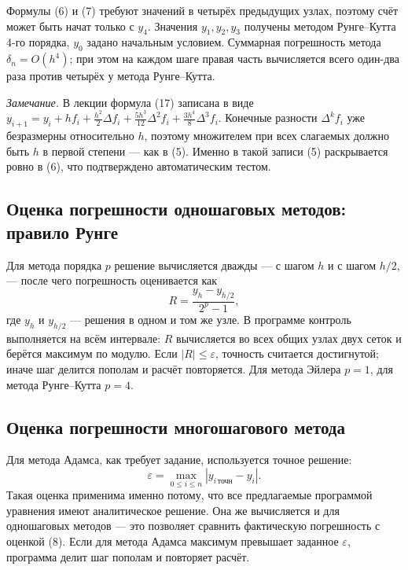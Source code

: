 \documentclass[12pt,a4paper]{article}
\begin{document}
Формулы (6) и (7) требуют значений в четырёх предыдущих узлах, поэтому счёт
может быть начат только с $y_4$. Значения $y_1,y_2,y_3$ получены методом
Рунге--Кутта 4-го порядка, $y_0$ задано начальным условием. Суммарная
погрешность метода $\delta_n=O(h^4)$; при этом на каждом шаге правая часть
вычисляется всего один-два раза против четырёх у метода Рунге--Кутта.

\medskip
\noindent\textit{Замечание.} В лекции формула (17) записана в виде
$y_{i+1}=y_i+hf_i+\frac{h^2}{2}\Delta f_i+\frac{5h^3}{12}\Delta^2f_i
+\frac{3h^4}{8}\Delta^3f_i$. Конечные разности $\Delta^kf_i$ уже безразмерны
относительно $h$, поэтому множителем при всех слагаемых должно быть $h$
в первой степени --- как в (5). Именно в такой записи (5) раскрывается
ровно в (6), что подтверждено автоматическим тестом.

\subsection{Оценка погрешности одношаговых методов: правило Рунге}
Для метода порядка $p$ решение вычисляется дважды --- с шагом $h$ и с шагом
$h/2$, --- после чего погрешность оценивается как
\begin{equation}
R=\frac{y_h-y_{h/2}}{2^{p}-1},
\end{equation}
где $y_h$ и $y_{h/2}$ --- решения в одном и том же узле. В программе контроль
выполняется на всём интервале: $R$ вычисляется во всех общих узлах двух
сеток и берётся максимум по модулю. Если $|R|\le\varepsilon$, точность
считается достигнутой; иначе шаг делится пополам и расчёт повторяется.
Для метода Эйлера $p=1$, для метода Рунге--Кутта $p=4$.

\subsection{Оценка погрешности многошагового метода}
Для метода Адамса, как требует задание, используется точное решение:
\begin{equation}
\varepsilon=\max\limits_{0\le i\le n}\left|y_{i\,\text{точн}}-y_i\right| .
\end{equation}
Такая оценка применима именно потому, что все предлагаемые программой
уравнения имеют аналитическое решение. Она же вычисляется и для одношаговых
методов --- это позволяет сравнить фактическую погрешность с оценкой (8).
Если для метода Адамса максимум превышает заданное $\varepsilon$, программа
делит шаг пополам и повторяет расчёт.

\end{document}
